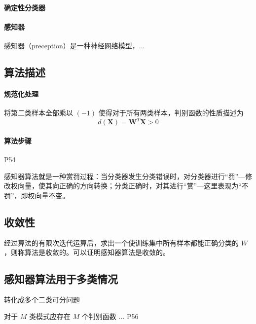\documentclass[11pt]{book}
\begin{document}
\paragraph{确定性分类器}%
\label{par:que_ding_xing_fen_lei_qi_}

\paragraph{感知器}%
\label{par:gan_zhi_qi_}

感知器（preception）是一种神经网络模型，$\ldots$

\subsection{算法描述}

\paragraph{规范化处理}%
\label{par:gui_fan_hua_chu_li_}

将第二类样本全部乘以 $(-1)$ 使得对于所有两类样本，判别函数的性质描述为
\begin{equation}
	d(\mathbf X) = \mathbf W^T \mathbf X > 0
\end{equation}

\paragraph{算法步骤}%
\label{par:suan_fa_bu_zou_}

P54


感知器算法就是一种赏罚过程：当分类器发生分类错误时，对分类器进行“罚”---修改权向量，使其向正确的方向转换；分类正确时，对其进行“赏”---这里表现为“不罚”，即权向量不变。

\subsection{收敛性}

经过算法的有限次迭代运算后，求出一个使训练集中所有样本都能正确分类的 $W$，则称算法是收敛的。可以证明感知器算法是收敛的。

\subsection{感知器算法用于多类情况}

转化成多个二类可分问题

对于 $M$ 类模式应存在 $M$ 个判别函数 $\ldots$ P56
\end{document}
